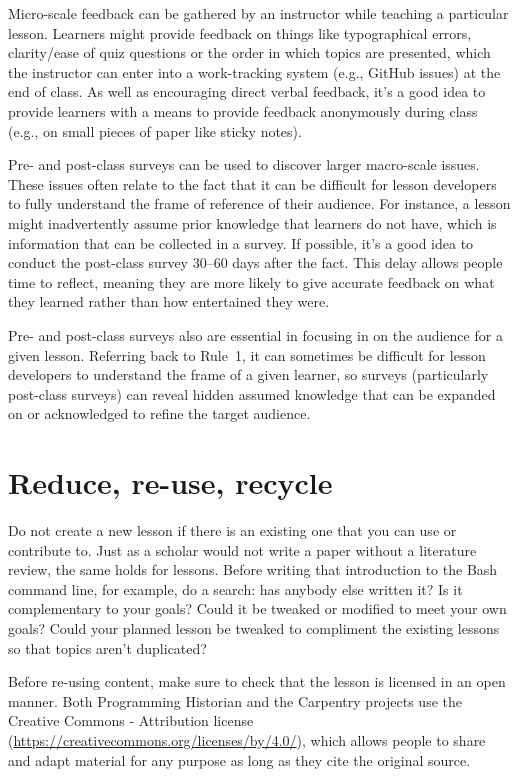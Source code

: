 \documentclass[10pt,letterpaper]{article}
\newcommand{\rulemajor}[1]{\section{#1}}
\begin{document}
Micro-scale feedback can be gathered by an instructor while teaching a particular lesson.
Learners might provide feedback on things like typographical errors,
clarity/ease of quiz questions or the order in which topics are presented,
which the instructor can enter into a work-tracking system (e.g., GitHub issues) at the end of class.
As well as encouraging direct verbal feedback,
it's a good idea to provide learners with a means to provide feedback anonymously during class
(e.g., on small pieces of paper like sticky notes).

Pre- and post-class surveys can be used to discover larger macro-scale issues.
These issues often relate to the fact that it can be difficult for lesson developers
to fully understand the frame of reference of their audience.
For instance, a lesson might inadvertently assume prior knowledge that learners do not have,
which is information that can be collected in a survey.
If possible, it's a good idea to conduct the post-class survey 30--60 days after the fact.
This delay allows people time to reflect,
meaning they are more likely to give accurate feedback on what they learned
rather than how entertained they were.

Pre- and post-class surveys also are essential in focusing in on the audience for a given lesson.
Referring back to Rule~1,
it can sometimes be difficult for lesson developers to understand the frame of a given learner,
so surveys (particularly post-class surveys) can reveal hidden assumed knowledge
that can be expanded on or acknowledged to refine the target audience.

\rulemajor{Reduce, re-use, recycle}

Do not create a new lesson if there is an existing one that you can use or contribute to.
Just as a scholar would not write a paper without a literature review,
the same holds for lessons.
Before writing that introduction to the Bash command line,
for example,
do a search:
has anybody else written it?
Is it complementary to your goals?
Could it be tweaked or modified to meet your own goals?
Could your planned lesson be tweaked to compliment the existing lessons so that topics aren't duplicated?

Before re-using content,
make sure to check that the lesson is licensed in an open manner.
Both Programming Historian and the Carpentry projects
use the Creative Commons - Attribution license
(\url{https://creativecommons.org/licenses/by/4.0/}),
which allows people to share and adapt material for any purpose
as long as they cite the original source.
\end{document}
